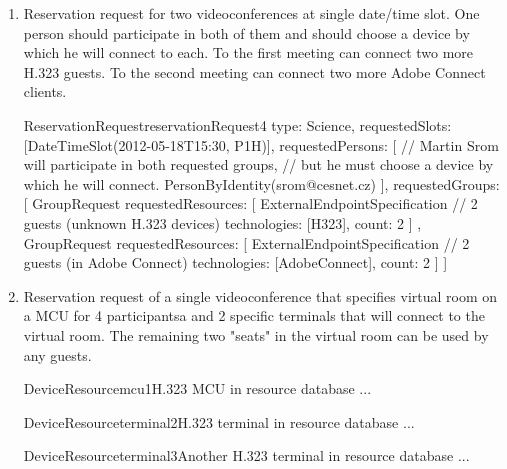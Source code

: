 \begin{enumerate}
\begin{EntityExample}{ReservationRequest}{reservationRequest3}{}
type: Science,
requestedSlots: [DateTimeSlot(2012-05-18T15:30, P1H)],
requestedPersons: [
  PersonByIdentity(srom@cesnet.cz),  // Martin Srom (must choose a device)
  PersonByIdentity(hopet@cesnet.cz), // Petr Holub (must choose a device)
  Person { // Jan Ruzicka (must choose a device)
    name: Jan Ruzicka,
    email: janru@cesnet.cz
  }
]
\end{EntityExample}

\item Reservation request for two videoconferences at single date/time slot. One person should participate in both of them and should choose a device by which he will connect to each. To the first meeting can connect two more H.323 guests. To the second meeting can connect two more Adobe Connect clients.

\begin{EntityExample}{ReservationRequest}{reservationRequest4}{}
type: Science,
requestedSlots: [DateTimeSlot(2012-05-18T15:30, P1H)],
requestedPersons: [
  // Martin Srom will participate in both requested groups,
  // but he must choose a device by which he will connect.
  PersonByIdentity(srom@cesnet.cz)
],
requestedGroups: [
  GroupRequest {
    requestedResources: [
      ExternalEndpointSpecification { // 2 guests (unknown H.323 devices)
        technologies: [H323],
        count: 2
      }
    ]
  },
  GroupRequest {
    requestedResources: [
      ExternalEndpointSpecification { // 2 guests (in Adobe Connect)
        technologies: [AdobeConnect],
        count: 2
      }
    ]
  }
]
\end{EntityExample}

\item Reservation request of a single videoconference that specifies virtual room on a MCU for 4 participantsa and 2 specific terminals that will connect to the virtual room. The remaining two "seats" in the virtual room can be used by any guests.

\begin{EntityExample}{DeviceResource}{mcu1}{H.323 MCU in resource database}
...
\end{EntityExample}

\begin{EntityExample}{DeviceResource}{terminal2}{H.323 terminal in resource database}
...
\end{EntityExample}

\begin{EntityExample}{DeviceResource}{terminal3}{Another H.323 terminal in resource database}
...
\end{EntityExample}


\end{enumerate}
